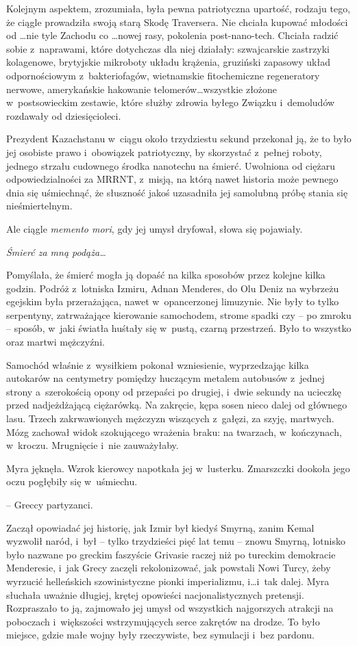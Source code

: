 \documentclass[oneside,polish,11pt,sfheadings]{mwbk}
\begin{document}
Kolejnym aspektem, zrozumiała, była pewna patriotyczna upartość, rodzaju
tego, że ciągle prowadziła swoją starą Skodę Traversera. Nie chciała
kupować młodości od \ldots nie tyle Zachodu co \ldots nowej rasy, pokolenia
post-nano-tech. Chciała radzić sobie z~naprawami, które dotychczas dla
niej działały: szwajcarskie zastrzyki kolagenowe, brytyjskie mikroboty
układu krążenia, gruziński zapasowy układ odpornościowym z~bakteriofagów, wietnamskie fitochemiczne regeneratory nerwowe,
amerykańskie hakowanie telomerów\ldots wszystkie złożone w~postsowieckim
zestawie, które służby zdrowia byłego Związku i~demoludów rozdawały
od dziesięcioleci.

Prezydent Kazachstanu w~ciągu około trzydziestu sekund przekonał ją, że
to było jej osobiste prawo i~obowiązek patriotyczny, by skorzystać z~pełnej roboty, jednego strzału cudownego środka nanotechu na śmierć.
Uwolniona od ciężaru odpowiedzialności za MRRNT, z~misją, na którą nawet
historia może pewnego dnia się uśmiechnąć, że słuszność jakoś uzasadniła
jej samolubną próbę stania się nieśmiertelnym.

Ale ciągle \textit{memento mori}, gdy jej umysł dryfował, słowa się
pojawiały.

\textit{Śmierć za mną podąża\ldots}

Pomyślała, że śmierć mogła ją dopaść na kilka sposobów przez kolejne
kilka godzin. Podróż z~lotniska Izmiru, Adnan Menderes, do Olu Deniz na
wybrzeżu egejskim była przerażająca, nawet w~opancerzonej limuzynie. Nie
były to tylko serpentyny, zatrważające kierowanie samochodem, strome
spadki czy -- po zmroku -- sposób, w~jaki światła huśtały się w~pustą,
czarną przestrzeń. Było to wszystko oraz martwi mężczyźni.

Samochód właśnie z~wysiłkiem pokonał wzniesienie, wyprzedzając kilka
autokarów na centymetry pomiędzy huczącym metalem autobusów z~jednej
strony a~szerokością opony od przepaści po drugiej, i~dwie sekundy na
ucieczkę przed nadjeżdżającą ciężarówką. Na zakręcie, kępa sosen nieco
dalej od głównego lasu. Trzech zakrwawionych mężczyzn wiszących z~gałęzi, za szyję, martwych. Mózg zachował widok szokującego wrażenia
braku: na twarzach, w~kończynach, w~kroczu. Mrugnięcie i~nie
zauważyłaby.

Myra jęknęła. Wzrok kierowcy napotkała jej w~lusterku. Zmarszczki
dookoła jego oczu pogłębiły się w~uśmiechu.

-- Greccy partyzanci.

Zaczął opowiadać jej historię, jak Izmir był kiedyś Smyrną, zanim Kemal
wyzwolił naród, i~był -- tylko trzydzieści pięć lat temu -- znowu 
Smyrną, lotnisko było nazwane po greckim faszyście Grivasie raczej niż
po tureckim demokracie Menderesie, i~jak Grecy zaczęli rekolonizować,
jak powstali Nowi Turcy, żeby wyrzucić helleńskich szowinistyczne pionki
imperializmu, i\ldots i~tak dalej. Myra słuchała uważnie długiej, krętej
opowieści nacjonalistycznych pretensji. Rozpraszało to ją, zajmowało jej
umysł od wszystkich najgorszych atrakcji na poboczach i~większości
wstrzymujących serce zakrętów na drodze. To było miejsce, gdzie małe
wojny były rzeczywiste, bez symulacji i~bez pardonu.
\end{document}
